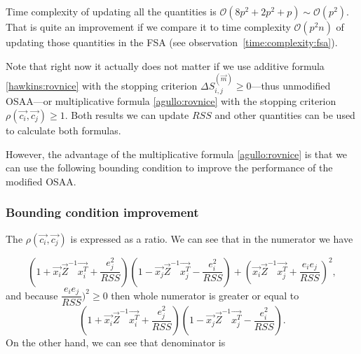 \begin{observation} \label{updatinginversionobservation}
Time complexity of updating all the quantities is 
$\mathcal{O}(8p^2 + 2p^2 + p) \sim \mathcal{O}(p^2)$.
That is quite an improvement if we compare it to time complexity $\mathcal{O}(p^2n)$ of updating those quantities in the FSA (see observation~\ref{time:complexity:fsa}).
\end{observation}


Note that right now it actually does not matter if we use additive formula \eqref{hawkins:rovnice} with the stopping criterion $\Delta S^{(\vec{m})}_{i,j} \geq 0$---thus unmodified OSAA---or multiplicative formula \eqref{agullo:rovnice} with the stopping criterion $\rho(\vec{c_i}, \vec{c_j}) \geq 1 $. Both results we can update $RSS$ and other quantities can be used to calculate both formulas. 

However, the advantage of the multiplicative formula \ref{agullo:rovnice} is that we can use the following bounding condition to improve the performance of the modified OSAA.



\subsubsection*{Bounding condition improvement}

The $\rho(\vec{c_i}, \vec{c_j})$ is expressed as a ratio. We can see that in the numerator we have

\begin{equation}
    (1+\vec{x_i}\vec{Z}^{-1}\vec{x_i^T} + \dfrac{e_j^2}{RSS})
        (1 - \vec{x_j}\vec{Z}^{-1}\vec{x_j^T} - \dfrac{e_i^2}{RSS} )+
        (\vec{x_i}\vec{Z}^{-1}\vec{x_j^T} + \dfrac{e_i e_j}{RSS} )^2,
\end{equation}
and because $ \dfrac{e_i e_j}{RSS} )^2 \geq 0$ then whole numerator is greater or equal to
\begin{equation}
    (1+\vec{x_i}\vec{Z}^{-1}\vec{x_i^T} + \dfrac{e_j^2}{RSS})
(1 - \vec{x_j}\vec{Z}^{-1}\vec{x_j^T} - \dfrac{e_i^2}{RSS} ).
\end{equation}
On the other hand, we can see that denominator is

